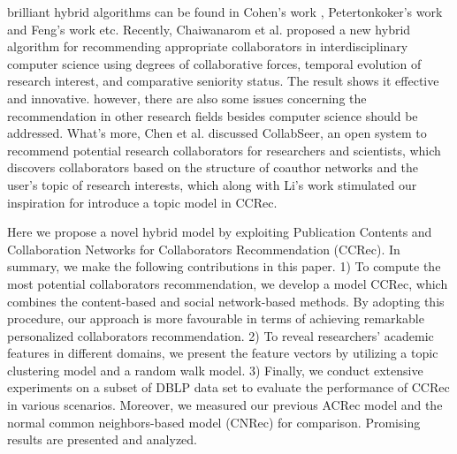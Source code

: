 \documentclass[10pt]{article}
\begin{document}
brilliant hybrid algorithms can be found in Cohen's work \cite{cohen2013recommending}, Petertonkoker's work \cite{petertonkoker2014scientific} and Feng's work \cite{xia2014socially} etc. Recently, Chaiwanarom et al. \cite{chaiwanarom2014collaborator} proposed a new hybrid algorithm for recommending appropriate collaborators in interdisciplinary computer science using degrees of collaborative forces, temporal evolution of research interest, and comparative seniority status. The result shows it effective and innovative. however, there are also some issues concerning the recommendation in other research fields besides computer science should be addressed. What's more, Chen et al. \cite{chen2011collabseer} discussed CollabSeer, an open system to recommend potential research collaborators for researchers and scientists, which discovers collaborators based on the structure of coauthor networks and the user's topic of research interests, which along with Li's work \cite{li2014author} stimulated our inspiration for introduce a topic model in CCRec.

Here we propose a novel hybrid model by exploiting Publication Contents and Collaboration Networks for Collaborators Recommendation (CCRec). In summary, we make the following contributions in this paper. 1) To compute the most potential collaborators recommendation, we develop a model CCRec, which combines the content-based and social network-based methods. By adopting this procedure, our approach is more favourable in terms of achieving remarkable personalized collaborators recommendation. 2) To reveal researchers' academic features in different domains, we present the feature vectors by utilizing a topic clustering model and a random walk model. 3) Finally, we conduct extensive experiments on a subset of DBLP data set to evaluate the performance of CCRec in various scenarios. Moreover, we measured our previous ACRec model and the normal common neighbors-based model (CNRec) for comparison. Promising results are presented and analyzed.

\end{document}
